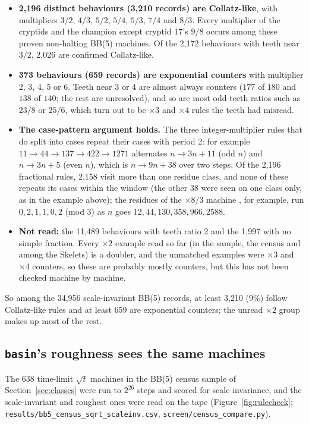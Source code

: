 \documentclass[11pt,a4paper]{article}
\newcommand{\tm}[1]{\texttt{\detokenize{#1}}}   %
\newcommand{\BB}[1]{BB(#1)}
\begin{document}
\begin{itemize}
\item \textbf{2,196 distinct behaviours (3,210 records) are Collatz-like}, with multipliers $3/2$,
$4/3$, $5/2$, $5/4$, $5/3$, $7/4$ and $8/3$. Every multiplier of the cryptids and the champion
except cryptid 17's $9/8$ occurs among these proven non-halting \BB{5} machines. Of the 2,172
behaviours with teeth near $3/2$, 2,026 are confirmed Collatz-like.
\item \textbf{373 behaviours (659 records) are exponential counters} with multiplier 2, 3, 4, 5 or
6. Teeth near 3 or 4 are almost always counters ($177$ of $180$ and $138$ of $140$; the rest are
unresolved), and so are most
odd teeth ratios such as $23/8$ or $25/6$, which turn out to be $\times3$ and $\times4$ rules the
teeth had misread.
\item \textbf{The case-pattern argument holds.} The three integer-multiplier rules that do split
into cases repeat their cases with period 2: for example $11 \to 44 \to 137 \to 422 \to 1271$
alternates $n \to 3n + 11$ (odd $n$) and $n \to 3n + 5$ (even $n$), which is $n \to 9n + 38$ over
two steps. Of the 2,196 fractional rules, 2,158 visit more than one residue class, and none of these repeats
its cases within the window (the other 38 were seen on one class only, as in the example above); the residues
of the $\times8/3$ machine \tm{1RB0LE_1RC0LA_1LD0RA_---1LE_1LB0LB}, for example, run
$0, 2, 1, 1, 0, 2$ (mod 3) as $n$ goes $12, 44, 130, 358, 966, 2588$.
\item \textbf{Not read:} the 11,489 behaviours with teeth ratio 2 and the 1,997 with no simple
fraction. Every $\times2$ example read so far (in the sample, the census and among the Skelets) is a
doubler, and the unmatched examples were $\times3$ and $\times4$ counters, so these are probably
mostly counters, but this has not been checked machine by machine.
\end{itemize}

So among the 34,956 scale-invariant \BB{5} records, at least 3,210 (9\%) follow Collatz-like rules
and at least 659 are exponential counters; the unread $\times2$ group makes up most of the rest.

\subsection{\texttt{basin}'s roughness sees the same machines}
The 638 time-limit $\sqrt t$ machines in the \BB{5} census sample of Section~\ref{sec:classes} were
run to $2^{26}$ steps and scored for scale invariance, and the scale-invariant and roughest ones
were read on the tape (Figure~\ref{fig:rulecheck}; \texttt{results/bb5\_census\_sqrt\_scaleinv.csv},
\texttt{screen/census\_compare.py}).
\end{document}

